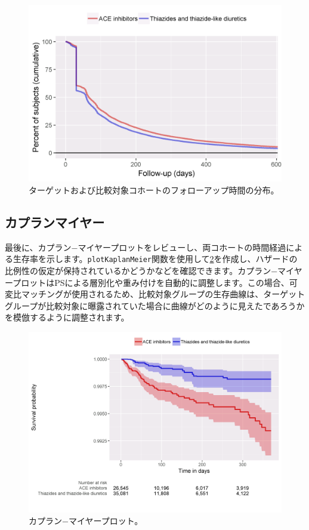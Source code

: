 \documentclass[
  11pt]{book}
\theoremstyle{definition}
\theoremstyle{definition}
\theoremstyle{definition}
\theoremstyle{definition}
\theoremstyle{remark}
\begin{document}
\begin{figure}

{\centering \includegraphics[width=0.8\linewidth]{images/PopulationLevelEstimation/followUp} 

}

\caption{ターゲットおよび比較対象コホートのフォローアップ時間の分布。}\label{fig:followUp}
\end{figure}

\subsection{カプランマイヤー}\label{ux30abux30d7ux30e9ux30f3ux30deux30a4ux30e4ux30fc}

最後に、カプラン−マイヤープロットをレビューし、両コホートの時間経過による生存率を示します。\texttt{plotKaplanMeier}関数を使用して\ref{fig:kmPlot}を作成し、ハザードの比例性の仮定が保持されているかどうかなどを確認できます。カプラン−マイヤープロットはPSによる層別化や重み付けを自動的に調整します。この場合、可変比マッチングが使用されるため、比較対象グループの生存曲線は、ターゲットグループが比較対象に曝露されていた場合に曲線がどのように見えたであろうかを模倣するように調整されます。  

\begin{figure}

{\centering \includegraphics[width=1\linewidth]{images/PopulationLevelEstimation/kmPlot} 

}

\caption{カプラン−マイヤープロット。}\label{fig:kmPlot}
\end{figure}
\end{document}
